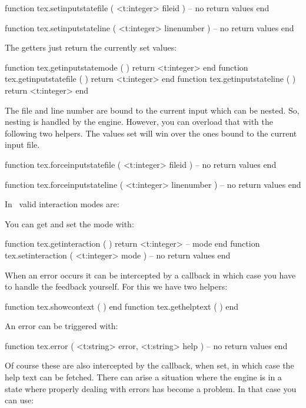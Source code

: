 \starttyping[option=LUA]
function tex.setinputstatefile ( <t:integer> fileid )
    -- no return values
end

function tex.setinputstateline ( <t:integer> linenumber )
    -- no return values
end
\stoptyping

The getters just return the currently set values:

\starttyping[option=LUA]
function tex.getinputstatemode ( ) return <t:integer> end
function tex.getinputstatefile ( ) return <t:integer> end
function tex.getinputstateline ( ) return <t:integer> end
\stoptyping

The file and line number are bound to the current input which can be nested. So,
nesting is handled by the engine. However, you can overload that with the
following two helpers. The values set will win over the ones bound to the current
input file.

\starttyping[option=LUA]
function tex.forceinputstatefile ( <t:integer> fileid )
    -- no return values
end

function tex.forceinputstateline ( <t:integer> linenumber )
    -- no return values
end
\stoptyping

\stopsubsection

\startsubsection[title=Interacting]

In \LUAMETATEX\ valid interaction modes are:

\startcolumns[n=2]
\stopcolumns

You can get and set the mode with:

\starttyping[option=LUA]
function tex.getinteraction ( )
    return <t:integer> -- mode
end
function tex.setinteraction ( <t:integer> mode )
    -- no return values
end
\stoptyping

When an error occurs it can be intercepted by a callback in which case you have
to handle the feedback yourself. For this we have two helpers:

\starttyping[option=LUA]
function tex.showcontext ( ) end
function tex.gethelptext ( ) end
\stoptyping

An error can be triggered with:

\starttyping[option=LUA]
function tex.error (
    <t:string> error,
    <t:string> help
)
    -- no return values
end
\stoptyping

Of course these are also intercepted by the callback, when set, in which case the
help text can be fetched. There can arise a situation where the engine is in a
state where properly dealing with errors has become a problem. In that case you
can use:


